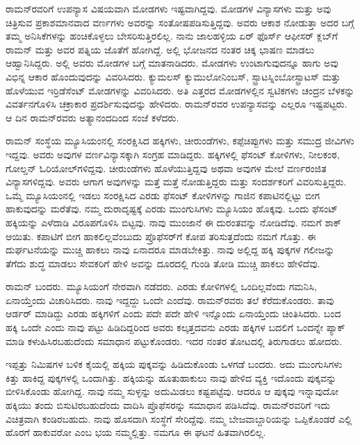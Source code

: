 ರಾಮನ್‍ರವರಿಗೆ ಉಪನ್ಯಾಸ ವಿಷಯವಾಗಿ ಮೋಡಗಳು ಇಷ್ಟವಾಗಿದ್ದವು. ಮೋಡಗಳ ವಿನ್ಯಾಸಗಳು ಮತ್ತು ಅವು ಚಿತ್ರಿಸುವ ಪ್ರಕಾಶಮಾನವಾದ ವರ್ಣಗಳು ಅವರನ್ನು ಸಂತೋಷ\-ಪಡಿಸುತ್ತಿದ್ದವು. ಅವರು ಆಕಾಶ ನೋಡುತ್ತಾ ಅದರ ಬಗ್ಗೆ ತಮ್ಮ ಅನಿಸಿಕೆಗಳನ್ನು ಹಂಚಿಕೊಳ್ಳಲು ಬೇಸರಿಸುತ್ತಿರಲಿಲ್ಲ. ನಾನು ಜಾಲಹಳ್ಳಿಯ ಏರ್ ಫೊರ್ಸ್ ಆಫೀಸರ್ ಕ್ಲಬ್‌ಗೆ ರಾಮನ್ ಮತ್ತು ಅವರ ಪತ್ನಿಯ ಜೊತೆಗೆ ಹೋಗಿದ್ದೆ. ಅಲ್ಲಿ ಭೋಜನದ ನಂತರ ಚಿಕ್ಕ ಭಾಷಣ ಮಾಡಲು ಆಹ್ವಾನಿಸಿದ್ದರು. ಅಲ್ಲಿ ಅವರು ಮೋಡಗಳ ಬಗ್ಗೆ ಮಾತನಾಡಿದರು. ಮೋಡಗಳು ಉಂಟಾಗುವುದನ್ನೂ ಹಾಗು ಅವು ವಿಭಿನ್ನ ಆಕಾರ ಹೊಂದುವುದನ್ನು ವಿವರಿಸಿದರು. ಕ್ಯುಮಲಸ್ ಕ್ಯುಮುಲೋನಿಂಬಸ್, ಸ್ಟ್ರಾಟಸ್\break ನಿಂಬೋಸ್ಟ್ರಾಟಸ್ ಮತ್ತು ಹೊಳೆಯುವ ಇರ್ರಿಡೆಸೆಂಟ್ ಮೋಡಗಳನ್ನು ವಿವರಿಸಿದರು. ಅತಿ ಎತ್ತರದ ಮೋಡಗಳಲ್ಲಿನ ಸ್ವಟಿಕಗಳು ಚಂದ್ರನ ಬೆಳಕನ್ನು ವಿವರ್ತನಗೊಳಿಸಿ ಚಕ್ರಾಕಾರ ಪ್ರದರ್ಶಿಸುವುದನ್ನು ಹೇಳಿದರು. ರಾಮನ್‌ರವರ ಉಪನ್ಯಾಸವನ್ನು ಎಲ್ಲರೂ ಇಷ್ಟಪಟ್ಟರು. ಆ ದಿನ ರಾಮನ್‌ರವರು ಅತ್ಯಾನಂದದಿಂದ ಸಂಜೆ ಕಳೆದರು. 

ರಾಮನ್ ಸಂಸ್ಥೆಯ ಮ್ಯೂಸಿಯಂನಲ್ಲಿ ಸಂರಕ್ಷಿಸಿದ ಹಕ್ಕಿಗಳು, ಚೀರುಂಡೆಗಳು, ಕಪ್ಪೆಚಿಪ್ಪುಗಳು ಮತ್ತು ಸಮುದ್ರ ಜೀವಿಗಳು ಇದ್ದವು. ಅವರು ಅವುಗಳ ವರ್ಣವಿನ್ಯಾಸಕ್ಕಾಗಿ ಸಂಗ್ರಹ ಮಾಡಿದ್ದರು. ಹಕ್ಕಿಗಳಲ್ಲಿ ಫೆಸಂಟ್ ಕೋಳಿಗಳು, ನೀಲಕಂಠ, ಗೋಲ್ಡನ್ ಓರಿಯೋಲ್‌ಗಳಿದ್ದವು. ಚೀರುಂಡೆಗಳು ಹೊಳೆಯುತ್ತಿದ್ದವು ಅಥವಾ ಅವುಗಳ ಮೇಲೆ ವರ್ಣರಂಜಿತ ವಿನ್ಯಾಸಗಳಿದ್ದವು. ಅವರು ಆಗಾಗ ಅವುಗಳನ್ನು ಮತ್ತೆ ಮತ್ತೆ ನೋಡುತ್ತಿದ್ದರು ಮತ್ತು ಸಂದರ್ಶಕರಿಗೆ ವಿವರಿಸುತ್ತಿದ್ದರು. ಒಮ್ಮೆ ಮ್ಯೂಸಿಯಂನಲ್ಲಿ ಇಡಲು ಸಂರಕ್ಷಿಸಿದ ಎರಡು ಫೆಸಂಟ್ ಕೋಳಿಗಳನ್ನು ಗಾಜಿನ ಕಪಾಟಿನಲ್ಲಿಟ್ಟು ಬೀಗ ಹಾಕುವುದನ್ನು ಮರೆತೆವು. ನಮ್ಮ ದುರಾದೃಷ್ಟಕ್ಕೆ ಎರಡು ಮುಂಗುಸಿಗಳು ಮ್ಯೂಸಿಯಂ ಹೊಕ್ಕವು. ಒಂದು ಫೆಸಂಟ್ ಹಕ್ಕಿಯನ್ನು ಎಳೆದಾಡಿ ವಿರೂಪಗೊಳಿಸಿ ಬಿಟ್ಟವು. ನಾವು ಮುಂಜಾನೆ ಈ ದುರಂತವನ್ನು ನೋಡಿದೆವು. ನಮಗೆ ಶಾಕ್ ಆಯಿತು. ಕಪಾಟಿಗೆ ಬೀಗ ಹಾಕಲಿಲ್ಲವೆಂಬುದು ಪ್ರೊಫೆಸರ್‌ಗೆ ಕೋಪ ತರಿಸುತ್ತದೆಂದು ನಮಗೆ ಗೊತ್ತು. ಈ ದುರ್ಘಟನೆಯನ್ನು ಮುಚ್ಚಿ ಹಾಕಲು ನಾವು ಏನಾದರೂ ಮಾಡಬೇಕಿತ್ತು. ನಾವು ಅಲ್ಲಿದ್ದ ಹಕ್ಕಿ ಪುಕ್ಕಗಳ ಗಲೀಜನ್ನು ತೆಗೆದು ಶುದ್ಧ ಮಾಡಲು ಸೇವಕರಿಗೆ ಹೇಳಿ ಅವನ್ನು ದೂರದಲ್ಲಿ ಗುಂಡಿ ತೋಡಿ ಮುಚ್ಚಿ ಹಾಕಲು ಹೇಳಿದೆವು.

ರಾಮನ್ ಬಂದರು. ಮ್ಯೂಸಿಯಂಗೆ ನೇರವಾಗಿ ನಡೆದರು. ಎರಡು ಕೋಳಿಗಳಲ್ಲಿ ಒಂದಿಲ್ಲವೆಂದು ಗಮನಿಸಿ, ಏನಾಯ್ತೆಂದು ವಿಚಾರಿಸಿದರು. ನಾವು ಇದ್ದದ್ದು ಒಂದೇ ಎಂದೆವು. ರಾಮನ್‌ರವರು ತಲೆ ಕೆರೆದುಕೊಂಡರು. ತಾವು ಆರ್ಡರ್ ಮಾಡಿದ್ದು ಎರಡು ಹಕ್ಕಿಗಳಿಗೆ ಎಂದು ಪದೇ ಪದೇ ಹೇಳಿ ಇನ್ನೊಂದು ಏನಾಯ್ತೆಂದು ಚಿಂತಿಸಿದರು. ಬಂದ ಹಕ್ಕಿ ಒಂದೇ ಎಂದು ನಾವು ಪಟ್ಟು ಹಿಡಿದಿದ್ದರಿಂದ ಅವರು ಕಲ್ಕತ್ತದವನು ಎರಡು ಹಕ್ಕಿಗಳ ಬದಲಿಗೆ ಒಂದನ್ನೇ ಪ್ಯಾಕ್ ಮಾಡಿ ಕಳುಹಿಸಿರಬಹುದೆಂದು ಸಮಾಧಾನ ಪಟ್ಟುಕೊಂಡರು. ಇದರ ನಂತರ ತೋಟದಲ್ಲಿ ತಿರುಗಾಡಲು ಹೋದರು.

ಇಪ್ಪತ್ತು ನಿಮಿಷಗಳ ಬಳಿಕ ಕೈಯಲ್ಲಿ ಹಕ್ಕಿಯ ಪುಕ್ಕವನ್ನು ಹಿಡಿದುಕೊಂಡು ಒಳಗಡೆ ಬಂದರು. ಅದು ಮುಂಗುಸಿಗಳು ಕಿತ್ತು ಹಾಕಿದ್ದ ಪುಕ್ಕಗಳಲ್ಲಿ ಒಂದಾಗಿತ್ತು. ಹಕ್ಕಿಯನ್ನು ಹೂತುಹಾಕುಲು ನಾವು ಹೇಳಿದ ವ್ಯಕ್ತಿ ಇದೊಂದು ಪುಕ್ಕವನ್ನು ಬೀಳಿಸಿಕೊಂಡು ಹೋಗಿದ್ದ. ನಾವು ನಮ್ಮ ಸುಳ್ಳನ್ನು ಅದುಮಿಡಲು ಕಷ್ಟಪಟ್ಟೆವು. ಆದರೂ ಆ ಪುಕ್ಕವು ಇನ್ನಾವುದೋ ಹಕ್ಕಿಯು ತಂದು ಬಿಸುಟಿರಬಹುದೆಂದು ವಾದಿಸಿ ಪ್ರೊಫೆಸರನ್ನು ಸಮಾಧಾನ ಪಡಿಸಿದೆವು. ರಾಮನ್‍ರವರಿಗೆ ಇದು ವಿಚಿತ್ರವಾಗಿ ಕಂಡಿರಬಹುದು. ನಾವು ಹೊಸದಾಗಿ ಸಂಸ್ಥೆಗೆ ಸೇರಿದ್ದೆವು. ನಮ್ಮ ಬೇಜವಾಬ್ದಾರಿಯನ್ನು ಒಪ್ಪಿಕೊಂಡರೆ ಎಲ್ಲಿ ಹೊರಗೆ ಹಾಕುವರೋ ಎಂಬ ಭಯ ನಮ್ಮಲ್ಲಿತ್ತು. ನಮಗೂ ಈ ಘಟನೆ ಹಿತವಾಗಿರಲಿಲ್ಲ.


